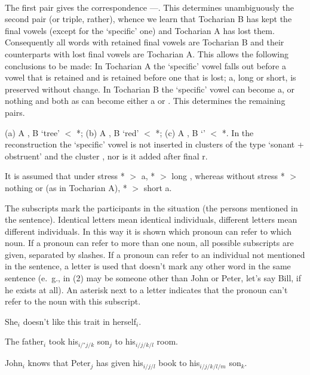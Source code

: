 \editrans
{}

\solution
%
\assignment

\medskip
\tochdone
\medskip \\
%
The first pair gives the correspondence ---.
This determines unambiguously the second pair (or triple, rather), whence we learn
that Tocharian B has kept the final vowels (except for the `specific' one) and Tocharian A has lost them.
Consequently all words  with retained final vowels are Tocharian B
and their counterparts with lost final vowels are Tocharian A.
This allows the following conclusions to be made:
In Tocharian A the `specific' vowel falls out before a vowel that is retained
and is retained before one that is lost;
\wipa a, long or short, is preserved without change.
In Tocharian B the `specific' vowel can become \wipa a, \wipa{\schwa} or nothing
and both {\wipa a\/}s can become either \wipa a or \wipa{\A}.
This determines the remaining pairs.

\assignment
%
(a) A , B  `tree' $<$ *;
(b) A , B  `red' $<$ *;
(c) A , B  `' $<$ *.
%
In the reconstruction the `specific' vowel is not inserted in clusters of the type
`sonant + obstruent' and the cluster ,
nor is it added after final \wipa r.

\assignment
It is assumed that under stress *\wipa{\schwa} $>$ \wipa a, * $>$ long \wipa{\A},
whereas without stress *\wipa{\schwa} $>$ nothing or \wipa{\schwa} (as in Tocharian A),
* $>$ short \wipa a.

\solution
%
\assignment The subscripts mark the participants in the situation (the persons mentioned in the sentence).
Identical letters mean identical individuals, different letters mean different individuals.
In this way it is shown which pronoun can refer to which noun.
If a pronoun can refer to more than one noun,
all possible subscripts are given, separated by slashes.
If a pronoun can refer to an individual not mentioned in the sentence,
a letter is used that doesn't mark any other word in the same sentence
(e.~g.,  in (2) may be someone other than John or Peter, let's say Bill, if he exists at all).
An asterisk next to a letter indicates
that the pronoun can't refer to the noun with this subscript.

\assignment
\begin{items}
\item She$_i$ doesn't like this trait in herself$_i$.
\item The father$_i$ took his$_{i/{}^*j/k}$ son$_j$ to his$_{i/j/k/l}$ room.
\item John$_i$ knows that Peter$_j$ has given his$_{i/j/l}$ book to his$_{i/j/k/l/m}$ son$_k$.
\end{items}

